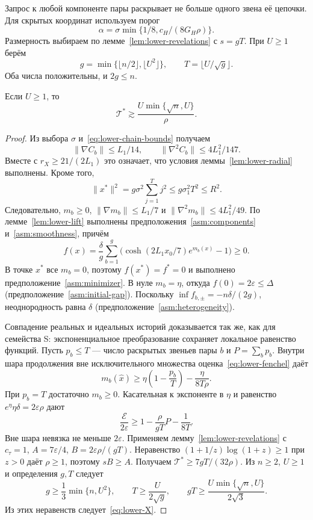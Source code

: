 Запрос к любой компоненте пары раскрывает не больше одного звена её цепочки.
Для скрытых координат используем порог
\[
 \alpha=\sigma\min\{1/8,c_H/(8G_H\rho)\}.
\]
Размерность выбираем по лемме~\ref{lem:lower-revelations} с $s=gT$.
При $U\ge1$ берём
\[
 g=\min\{\lfloor n/2\rfloor,\lfloor U^2\rfloor\},
 \qquad T=\lfloor U/\sqrt g\rfloor.
\]
Оба числа положительны, и $2g\le n$.

\begin{lemma}\label{lem:lower-X}
Если $U\ge1$, то
\begin{equation}\label{eq:lower-X}
 \mathcal T^\ast\gtrsim
 \frac{U\min\{\sqrt n,U\}}{\rho}.
\end{equation}
\end{lemma}

\begin{proof}
Из выбора $\sigma$ и~\eqref{eq:lower-chain-bounds} получаем
\[
 \|\nabla C_b\|\le L_1/14,\qquad
 \|\nabla^2C_b\|\le4L_1^2/147.
\]
Вместе с $r_X\ge21/(2L_1)$ это означает, что условия
леммы~\ref{lem:lower-radial} выполнены. Кроме того,
\[
 \|x^\ast\|^2=g\sigma^2\sum_{j=1}^Tj^2
 \le g\sigma_1^2T^2\le R^2.
\]
Следовательно, $m_b\ge0$,
$\|\nabla m_b\|\le L_1/7$ и $\|\nabla^2m_b\|\le4L_1^2/49$.
По лемме~\ref{lem:lower-lift} выполнены предположения~\ref{asm:components}
и~\ref{asm:smoothness}, причём
\[
 f(x)=\frac\delta g\sum_{b=1}^g
 \bigl(\cosh(2L_1x_0/7)e^{m_b(x)}-1\bigr)\ge0.
\]
В точке $x^\ast$ все $m_b=0$, поэтому $f(x^\ast)=f^\ast=0$
и выполнено предположение~\ref{asm:minimizer}.
В нуле $m_b=\eta$, откуда $f(0)=2\varepsilon\le\Delta$
(предположение~\ref{asm:initial-gap}).
Поскольку $\inf f_{b,\pm}=-n\delta/(2g)$, неоднородность равна $\delta$
(предположение~\ref{asm:heterogeneity}).

Совпадение реальных и идеальных историй доказывается так же, как для семейства S:
экспоненциальное преобразование сохраняет локальное равенство функций.
Пусть $p_b\le T$ --- число раскрытых звеньев пары $b$ и $P=\sum_b p_b$.
Внутри шара продолжения вне исключительного множества
оценка~\eqref{eq:lower-fenchel} даёт
\[
 m_b(\hat x)\ge\eta\left(1-\frac{p_b}{T}\right)
 -\frac{\eta}{8T\rho}.
\]
При $p_b=T$ достаточно $m_b\ge0$.
Касательная к экспоненте в $\eta$ и равенство
$e^\eta\eta\delta=2\varepsilon\rho$ дают
\[
 \frac{\mathcal E}{2\varepsilon}
 \ge1-\frac{\rho}{gT}P-\frac1{8T}.
\]
Вне шара невязка не меньше $2\varepsilon$.
Применяем лемму~\ref{lem:lower-revelations} с
$c_\tau=1$, $A=7\varepsilon/4$, $B=2\varepsilon\rho/(gT)$.
Неравенство $(1+1/z)\log(1+z)\ge1$ при $z>0$ даёт
$\rho\ge1$, поэтому $sB\ge A$.
Получаем $\mathcal T^\ast\ge7gT/(32\rho)$.
Из $n\ge2$, $U\ge1$ и определения $g,T$ следует
\[
 g\ge\frac13\min\{n,U^2\},\qquad
 T\ge\frac{U}{2\sqrt g},\qquad
 gT\ge\frac{U\min\{\sqrt n,U\}}{2\sqrt3}.
\]
Из этих неравенств следует~\eqref{eq:lower-X}.
\end{proof}

